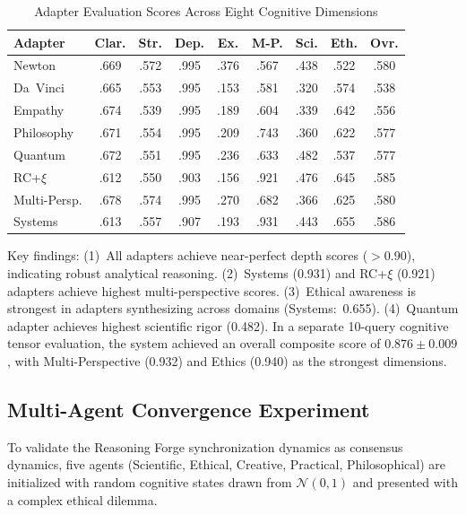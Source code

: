 \documentclass[11pt,a4paper]{article}
\begin{document}
\begin{table}[H]
\centering
\caption{Adapter Evaluation Scores Across Eight Cognitive Dimensions}
\label{tab:adapter_scores}
\begin{tabular}{@{}lccccccc|c@{}}
\toprule
\textbf{Adapter} & \textbf{Clar.} & \textbf{Str.} & \textbf{Dep.} & \textbf{Ex.} & \textbf{M-P.} & \textbf{Sci.} & \textbf{Eth.} & \textbf{Ovr.} \\
\midrule
Newton         & .669 & .572 & .995 & .376 & .567 & .438 & .522 & .580 \\
Da~Vinci       & .665 & .553 & .995 & .153 & .581 & .320 & .574 & .538 \\
Empathy        & .674 & .539 & .995 & .189 & .604 & .339 & .642 & .556 \\
Philosophy     & .671 & .554 & .995 & .209 & .743 & .360 & .622 & .577 \\
Quantum        & .672 & .551 & .995 & .236 & .633 & .482 & .537 & .577 \\
RC+$\xi$       & .612 & .550 & .903 & .156 & .921 & .476 & .645 & .585 \\
Multi-Persp.   & .678 & .574 & .995 & .270 & .682 & .366 & .625 & .580 \\
Systems        & .613 & .557 & .907 & .193 & .931 & .443 & .655 & .586 \\
\bottomrule
\end{tabular}
\end{table}

Key findings: (1)~All adapters achieve near-perfect depth scores ($>0.90$), indicating robust analytical reasoning. (2)~Systems (0.931) and RC+$\xi$ (0.921) adapters achieve highest multi-perspective scores. (3)~Ethical awareness is strongest in adapters synthesizing across domains (Systems:~0.655). (4)~Quantum adapter achieves highest scientific rigor (0.482). In a separate 10-query cognitive tensor evaluation, the system achieved an overall composite score of $0.876 \pm 0.009$, with Multi-Perspective (0.932) and Ethics (0.940) as the strongest dimensions.

\subsection{Multi-Agent Convergence Experiment}
\label{sec:convergence}
To validate the Reasoning Forge synchronization dynamics as consensus dynamics, five agents (Scientific, Ethical, Creative, Practical, Philosophical) are initialized with random cognitive states drawn from $\mathcal{N}(0, 1)$ and presented with a complex ethical dilemma.
\end{document}
